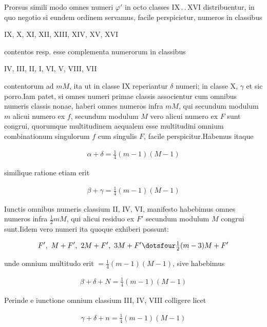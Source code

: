 Prorsus simili modo omnes numeri $\varphi'$ in octo classes IX\,.\,.\,XVI distribuentur, in quo negotio si eundem ordinem servamus, facile perspicietur, numeros in classibus

\begin{center}IX, X, XI, XII, XIII, XIV, XV, XVI\end{center}

contentos resp. esse complementa numerorum in classibus

\begin{center}IV, III, II, I, VI, V, VIII, VII\end{center}

contentorum ad $mM$, ita ut in classe IX reperiantur $\delta$ numeri; in classe X, $\gamma$ et sic porro.\quad Iam patet, si omnes numeri primae classis associentur cum omnibus numeris classis nonae, haberi omnes numeros infra $mM$, qui secundum modulum $m$ alicui numero ex $f$, secundum modulum $M$ vero alicui numero ex $F$ sunt congrui, quorumque multitudinem aequalem esse multitudini omnium combinationum singulorum $f$ cum singulis $F$, facile perspicitur.\quad Habemus itaque

\[
\begin{aligned}
\alpha+\delta=\tfrac14(m-1)(M-1)
\end{aligned}
\]

similique ratione etiam erit

\[
\begin{aligned}
\beta+\gamma=\tfrac14(m-1)(M-1)
\end{aligned}
\]

Iunctis omnibus numeris classium II, IV, VI, manifesto habebimus omnes numeros infra $\frac12mM$, qui alicui residuo ex $F'$ secundum modulum $M$ congrui sunt.\quad Iidem vero numeri ita quoque exhiberi possunt:

\[
\begin{aligned}
F',\ M+F',\ 2M+F',\ 3M+F'\dotsfour\tfrac12(m-3)M+F'
\end{aligned}
\]

unde omnium multitudo erit $=\frac14(m-1)(M-1)$, sive habebimus

\[
\begin{aligned}
\beta+\delta+N=\tfrac14(m-1)(M-1)
\end{aligned}
\]

Perinde e iunctione omnium classium III, IV, VIII colligere licet

\[
\begin{aligned}
\gamma+\delta+n=\tfrac14(m-1)(M-1)
\end{aligned}
\]

